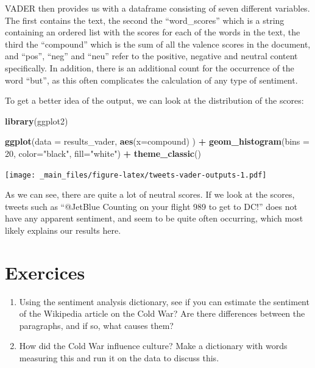\documentclass[
]{book}
\newenvironment{Shaded}{\begin{snugshade}}{\end{snugshade}}
\newcommand{\AttributeTok}[1]{\textcolor[rgb]{0.13,0.29,0.53}{#1}}
\newcommand{\DecValTok}[1]{\textcolor[rgb]{0.00,0.00,0.81}{#1}}
\newcommand{\FunctionTok}[1]{\textcolor[rgb]{0.13,0.29,0.53}{\textbf{#1}}}
\newcommand{\NormalTok}[1]{#1}
\newcommand{\SpecialCharTok}[1]{\textcolor[rgb]{0.81,0.36,0.00}{\textbf{#1}}}
\newcommand{\StringTok}[1]{\textcolor[rgb]{0.31,0.60,0.02}{#1}}
\providecommand{\tightlist}{%
  \setlength{\itemsep}{0pt}\setlength{\parskip}{0pt}}
\begin{document}
VADER then provides us with a dataframe consisting of seven different variables. The first contains the text, the second the ``word\_scores'' which is a string containing an ordered list with the scores for each of the words in the text, the third the ``compound'' which is the sum of all the valence scores in the document, and ``pos'', ``neg'' and ``neu'' refer to the positive, negative and neutral content specifically. In addition, there is an additional count for the occurrence of the word ``but'', as this often complicates the calculation of any type of sentiment.

To get a better idea of the output, we can look at the distribution of the scores:

\begin{Shaded}
\begin{Highlighting}[]
\FunctionTok{library}\NormalTok{(ggplot2)}

\FunctionTok{ggplot}\NormalTok{(}\AttributeTok{data =}\NormalTok{ results\_vader,}
       \FunctionTok{aes}\NormalTok{(}\AttributeTok{x=}\NormalTok{compound)}
\NormalTok{       ) }\SpecialCharTok{+} 
\FunctionTok{geom\_histogram}\NormalTok{(}\AttributeTok{bins =} \DecValTok{20}\NormalTok{,}
               \AttributeTok{color=}\StringTok{"black"}\NormalTok{,}
               \AttributeTok{fill=}\StringTok{"white"}\NormalTok{) }\SpecialCharTok{+}
\FunctionTok{theme\_classic}\NormalTok{()}
\end{Highlighting}
\end{Shaded}

\texttt{[image: \_main\_files/figure-latex/tweets-vader-outputs-1.pdf]}

As we can see, there are quite a lot of neutral scores. If we look at the scores, tweets such as ``@JetBlue Counting on your flight 989 to get to DC!'' does not have any apparent sentiment, and seem to be quite often occurring, which most likely explains our results here.

\chapter{Exercices}\label{exercices}

\begin{enumerate}
\def\labelenumi{\arabic{enumi}.}
\tightlist
\item
  Using the sentiment analysis dictionary, see if you can estimate the sentiment of the Wikipedia article on the Cold War? Are there differences between the paragraphs, and if so, what causes them?
\item
  How did the Cold War influence culture? Make a dictionary with words measuring this and run it on the data to discuss this.
\end{enumerate}
\end{document}
